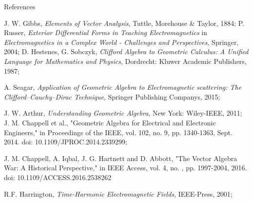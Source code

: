 \documentclass[10pt]{beamer}
\begin{document}
\begin{frame}[allowframebreaks]{References}


\begin{thebibliography}{99}
%
%
%
J. W. Gibbs, \emph{Elements of Vector Analysis}, Tuttle, Morehouse \& Taylor, 1884;
P. Russer, \emph{Exterior Differential Forms in Teaching Electromagnetics} in \emph{Electromagnetics in a Complex World - Challenges and Perspectives}, Springer, 2004;
D. Hestenes, G. Sobczyk, \emph{Clifford Algebra to Geometric Calculus: A Unified Language for  Mathematics and Physics}, Dordrecht: Kluwer Academic Publishers, 1987;

A. Seagar, \emph{Application of Geometric Algebra to Electromagnetic scattering: The Clifford--Cauchy--Dirac Technique}, Springer Publishing Companys, 2015;


J. W. Arthur, \emph{Understanding Geometric Algebra}, New York: Wiley-IEEE, 2011;
J. M. Chappell et al., "Geometric Algebra for Electrical and Electronic Engineers," in Proceedings of the IEEE, vol. 102, no. 9, pp. 1340-1363, Sept. 2014. doi: 10.1109/JPROC.2014.2339299;

J. M. Chappell, A. Iqbal, J. G. Hartnett and D. Abbott, "The Vector Algebra War: A Historical Perspective," in IEEE Access, vol. 4, no. , pp. 1997-2004, 2016.
doi: 10.1109/ACCESS.2016.2538262

R.F. Harrington, \emph{Time-Harmonic Electromagnetic Fields}, IEEE-Press, 2001;

%
\end{thebibliography}
\end{frame}





\end{document}
